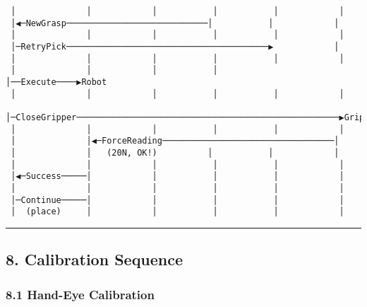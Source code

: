 \documentclass[
]{article}
\begin{document}
\begin{verbatim}
 │              │            │           │           │            │
 │◀─NewGrasp────────────────────────────│           │            │
 │              │            │           │           │            │
 │─RetryPick────────────────────────────────────────▶            │
 │              │            │           │           │            │
 │              │            │           │           │──Execute────▶Robot
 │              │            │           │           │            │
 │─CloseGripper────────────────────────────────────────────────────▶Gripper
 │              │            │           │           │            │
 │              │◀─ForceReading──────────────────────────────────│
 │              │   (20N, OK!)          │           │            │
 │              │            │           │           │            │
 │◀─Success─────│            │           │           │            │
 │              │            │           │           │            │
 │─Continue─────│            │           │           │            │
 │  (place)     │            │           │           │            │
\end{verbatim}

\begin{center}\rule{0.5\linewidth}{0.5pt}\end{center}

\hypertarget{calibration-sequence}{%
\subsection{8. Calibration Sequence}\label{calibration-sequence}}

\hypertarget{hand-eye-calibration}{%
\subsubsection{8.1 Hand-Eye Calibration}\label{hand-eye-calibration}}
\end{document}
